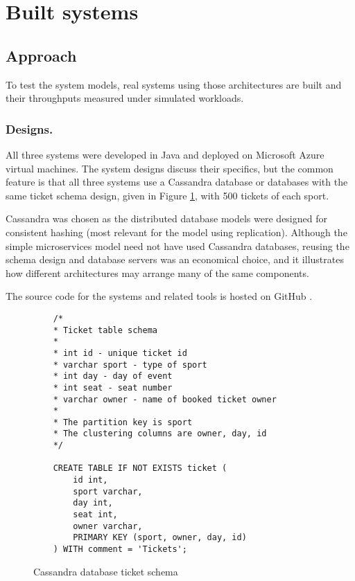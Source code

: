 %
%

\section{Built systems}\label{sec:built-systems}

\subsection{Approach}

To test the system models, real systems using those architectures are built and their throughputs measured under simulated workloads.

\subsubsection{Designs.}  All three systems were developed in Java and deployed on Microsoft Azure virtual machines.  The system designs discuss their specifics, but the common feature is that all three systems use a Cassandra database or databases with the same ticket schema design, given in Figure \ref{figure:cassandra_ticket_schema}, with 500 tickets of each sport.

Cassandra was chosen as the distributed database models were designed for consistent hashing (most relevant for the model using replication).  Although the simple microservices model need not have used Cassandra databases, reusing the schema design and database servers was an economical choice, and it illustrates how different architectures may arrange many of the same components.

The source code for the systems and related tools is hosted on GitHub \cite{RN1073}.

\begin{figure}
	\caption{Cassandra database ticket schema}
	\label{figure:cassandra_ticket_schema}
	\centering
	\begin{lstlisting}
	/*
	* Ticket table schema
	* 
	* int id - unique ticket id
	* varchar sport - type of sport
	* int day - day of event
	* int seat - seat number
	* varchar owner - name of booked ticket owner
	* 
	* The partition key is sport
	* The clustering columns are owner, day, id
	*/
	
	CREATE TABLE IF NOT EXISTS ticket (
		id int,
		sport varchar,
		day int,
		seat int,
		owner varchar,
		PRIMARY KEY (sport, owner, day, id)
	) WITH comment = 'Tickets';
	\end{lstlisting}
\end{figure}

